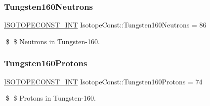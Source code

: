 \subsubsection{\texorpdfstring{Tungsten160\+Neutrons}{Tungsten160Neutrons}}
{\footnotesize\ttfamily \mbox{\hyperlink{group___isotope_const-_macros_ga5f18360b3e99483a35c32d789e62621c}{I\+S\+O\+T\+O\+P\+E\+C\+O\+N\+S\+T\+\_\+\+I\+NT}} Isotope\+Const\+::\+Tungsten160\+Neutrons = 86}

\$ \$ Neutrons in Tungsten-\/160. \mbox{\label{group___isotope_const-_tungsten-_w160_ga6c2462db4222bb5ba056e738b8f99c72}} 
\subsubsection{\texorpdfstring{Tungsten160\+Protons}{Tungsten160Protons}}
{\footnotesize\ttfamily \mbox{\hyperlink{group___isotope_const-_macros_ga5f18360b3e99483a35c32d789e62621c}{I\+S\+O\+T\+O\+P\+E\+C\+O\+N\+S\+T\+\_\+\+I\+NT}} Isotope\+Const\+::\+Tungsten160\+Protons = 74}

\$ \$ Protons in Tungsten-\/160. 